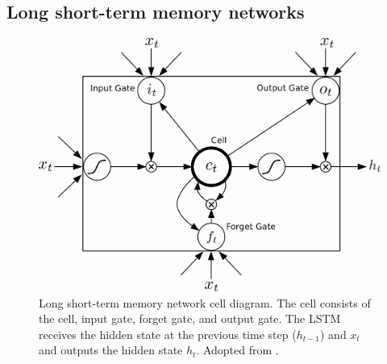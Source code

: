 \subsection{Long short-term memory networks}
\label{sec:lstm}

\begin{figure}
\includegraphics[scale=0.23]{lstm_2.png}
\caption{Long short-term memory network cell diagram. The cell consists of the 
	cell, input gate, forget gate, and output gate. The LSTM receives
	the hidden state at the previous time step ($h_{t - 1}$) and $x_t$
	and outputs the hidden state $h_{t}$.
	Adopted from 
\citep{graves2013hybrid}. }
\label{fig:lstm_arch}
\end{figure}

